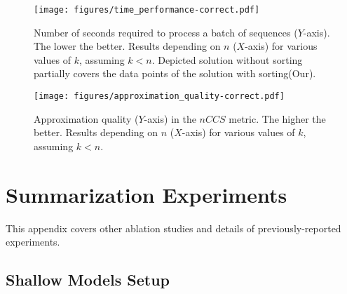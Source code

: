 \documentclass{article}
\begin{document}
\begin{figure}
    \centering
    \texttt{[image: figures/time\_performance-correct.pdf]}
    \caption{Number of seconds required to process a batch of sequences ($Y$-axis). The lower the better. Results depending on $n$ ($X$-axis) for various values of $k$, assuming $k<n$. Depicted solution without sorting partially covers the data points of the solution with sorting(Our).}
    \label{fig:performance}
\end{figure}

\begin{figure}
    \centering
    \texttt{[image: figures/approximation\_quality-correct.pdf]}
    \caption{Approximation quality ($Y$-axis) in the $nCCS$ metric. The higher the better. Results depending on $n$ ($X$-axis) for various values of $k$, assuming $k<n$.}
    \label{fig:performance2}
\end{figure}


\section{Summarization Experiments}\label{appendix_experiment_details}

This appendix covers other ablation studies and details of previously-reported experiments.

\subsection{Shallow Models Setup}
\end{document}

